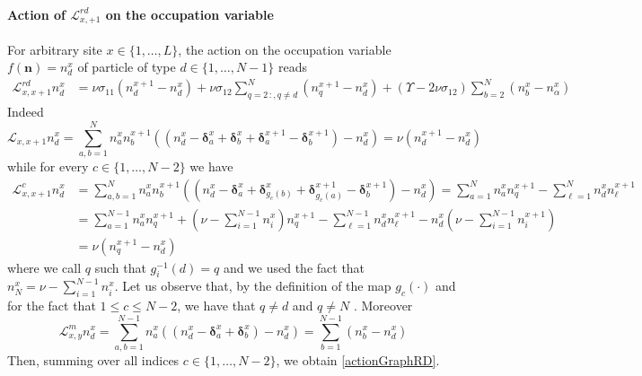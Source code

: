 \documentclass[10pt]{article}
\numberwithin{equation}{section}
\numberwithin{equation}{subsection}
\begin{document}
\paragraph{Action of $\mathcal{L}_{x,+1}^{rd}$ on the occupation variable}
For arbitrary site $x\in \{1,\ldots,L\}$, the action on the occupation variable $f(\bm{n})=n_{d}^{x}$ of particle of type $d\in \{1,\ldots,N-1\}$ reads
\begin{equation}\label{actionGraphRD}
	\begin{split}
		\mathcal{L}_{x,x+1}^{rd}n_{d}^{x}&=\nu \sigma_{11}(n_{d}^{x+1}-n_{d}^{x})+\nu\sigma_{12}\sum_{q=2\,:	,q\neq d}^{N}(n_{q}^{x+1}-n_{d}^{x})+(\Upsilon-2\nu\sigma_{12})\sum_{b=2}^{N}(n_{b}^{x}-n_{\alpha}^{x})
	\end{split}
\end{equation}
Indeed
\begin{equation}
	\mathcal{L}_{x,x+1}n_{d}^{x}=\sum_{a,b=1}^{N}n_{a}^{x}n_{b}^{x+1}\left((n_{d}^{x}-\bm{\delta}_{a}^{x}+\bm{\delta}_{b}^{x}+\bm{\delta}_{a}^{x+1}-\bm{\delta}_{b}^{x+1})-n_{d}^{x}\right)=\nu\left(n_{d}^{x+1}-n_{d}^{x}\right)
\end{equation}
while for every $c\in \{1,\ldots,N-2\}$ we have 
\begin{equation}
	\begin{split}
		\mathcal{L}_{x,x+1}^{c}n_{d}^{x}&=\sum_{a,b=1}^{N}n_{a}^{x}n_{b}^{x+1}\left((n_{d}^{x}-\bm{\delta}_{a}^{x}+\bm{\delta}_{g_{c}(b)}^{x}+\bm{\delta}_{g_{c}(a)}^{x+1}-\bm{\delta}_{b}^{x+1})-n_{d}^{x}\right)=\sum_{a=1}^{N}n_{a}^{x}n_{q}^{x+1}-\sum_{\ell=1}^{N}n_{d}^{x}n_{\ell}^{x+1}
		\\&=
		\sum_{a=1}^{N-1}n_{a}^{x}n_{q}^{x+1}+\left(\nu-\sum_{i=1}^{N-1}n_{i}^{x}\right)n_{q}^{x+1}-\sum_{\ell=1}^{N-1}n_{d}^{x}n_{\ell}^{x+1}-n_{d}^{x}\left(\nu-\sum_{i=1}^{N-1}n_{i}^{x+1}\right)
		\\&=
		\nu(n_{q}^{x+1}-n_{d}^{x})
	\end{split}
\end{equation}
where we call $q$ such that $g_{i}^{-1}(d)=q$ and we used the fact that $n_{N}^{x}=\nu-\sum_{i=1}^{N-1}n_{i}^{x}$. Let us observe that, by the definition of the map $g_{c}(\cdot)$ and for the fact that $1\leq c\leq N-2$, we have that $q\neq d$ and $q\neq N$ .
Moreover
\begin{equation}
	\mathcal{L}_{x,y}^{m}n_{d}^{x}=\sum_{a,b=1}^{N-1}n_{a}^{x}\left((n_{d}^{x}-\bm{\delta}_{a}^{x}+\bm{\delta}_{b}^{x})-n_{d}^{x}\right)=\sum_{b=1}^{N-1}(n_{b}^{x}-n_{d}^{x})
\end{equation}
Then, summing over all indices $c\in\{1,\ldots,N-2\}$, we obtain \eqref{actionGraphRD}.
\end{document}
